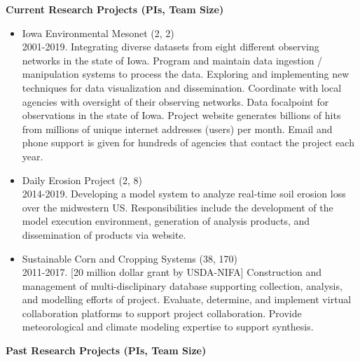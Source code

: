 \vspace*{0.25in}
\Large \bf Current Research Projects (PIs, Team Size)
\normalsize \sf
\begin{itemize}
\item Iowa Environmental Mesonet (2, 2)\\
2001-2019. Integrating diverse datasets from eight
different observing networks in the state of Iowa.  Program and maintain data
ingestion / manipulation systems to process the data. Exploring and implementing 
new techniques for data visualization and dissemination.  Coordinate with local
agencies with oversight of their observing networks.  Data focalpoint for 
observations in the state of Iowa. Project website generates billions of hits 
from millions of unique internet addresses (users) per month.  Email and 
phone support is given for hundreds of agencies that contact the project each
year.
\item Daily Erosion Project (2, 8)\\
2014-2019. Developing a model system to analyze real-time soil erosion loss over the 
midwestern US.  Responsibilities include the development of the model execution
environment, generation of analysis products, and dissemination of products 
via website.
\item Sustainable Corn and Cropping Systems (38, 170)\\
2011-2017. [20 million dollar grant by USDA-NIFA] Construction and management of multi-disclipinary database supporting collection, analysis, and modelling efforts of project. 
Evaluate, determine, and implement virtual collaboration platforms to 
support project collaboration.  Provide meteorological and climate modeling
expertise to support synthesis.
\end{itemize}
\vspace*{0.25in}
\Large \bf Past Research Projects (PIs, Team Size)
\normalsize \sf

